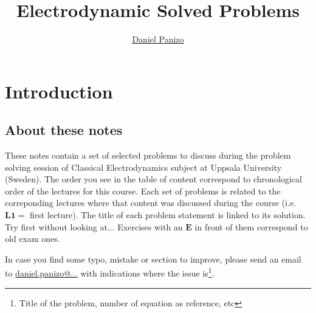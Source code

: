 \documentclass[a4paper,12pt]{article}
\numberwithin{equation}{subsection}
\begin{document}
\author{\hyperlink{daniel.panizo@physics.uu.se}{Daniel Panizo}} %
\title{Electrodynamic Solved Problems} %
\date{} %


\maketitle
\setcounter{tocdepth}{2}
\tableofcontents



\section{Introduction}
\subsection{About these notes}
These notes contain a set of selected problems to discuss during the problem solving session of Classical Electrodynamics subject at Uppsala University (Sweden). The order you see in the table of content correspond to chronological order of the lectures for this course. Each set of problems is related to the correponding lectures where that content was discussed during the course (i.e. $\mathbf{L 1} = $ first lecture). The title of each problem statement is linked to its solution. Try first without looking at...
Exercises with an $\mathbf{E}$ in front of them correspond to old exam ones.


In case you find some typo, mistake or section to improve, please send an email to \hyperlink{daniel.panizo@physics.uu.se}{daniel.panizo@...} with indications where the issue is\footnote{Title of the problem, number of equation as reference, etc}. 
\end{document}
